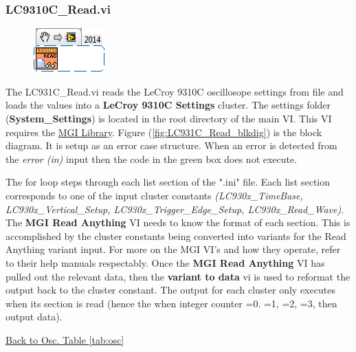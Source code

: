 \documentclass[11pt,a4paper,oldfontcommands]{memoir}
\begin{document}
\subsubsection{LC9310C\_Read.vi}

\noindent\hrulefill

\begin{figure}[H]
	\includegraphics[scale=0.625]{LC931C_Read_main}
	\label{fig:LC9310C_Read_main}
\end{figure}

The LC931C\_Read.vi reads the LeCroy 9310C oscillosope settings from file and loads the values into a \textbf{LeCroy 9310C Settings} cluster. The settings folder (\textbf{System\_Settings}) is located in the root directory of the main VI. This VI requires the \href{http://sine.ni.com/nips/cds/view/p/lang/en/nid/209753}{MGI Library}. Figure (\ref{fig:LC931C_Read_blkdig}) is the block diagram.  It is setup as an error case structure. When an error is detected from the \textit{error (in)} input then the code in the green box does not execute.

The for loop steps through each list section of the ".ini" file. Each list section corresponds to one of the input cluster constants \textit{(LC930x\_TimeBase, LC930x\_Vertical\_Setup, LC930x\_Trigger\_Edge\_Setup, LC930x\_Read\_Wave)}. The \textbf{MGI Read Anything} VI needs to know the format of each section. This is accomplished by the cluster constants being converted into variants for the Read Anything variant input.  For more on the MGI VI's and how they operate, refer to their help manuals respectably. Once the \textbf{MGI Read Anything} VI has pulled out the relevant data, then the \textbf{variant to data} vi is used to reformat the output back to the cluster constant. The output for each cluster only executes when its section is read (hence the when integer counter =0. =1, =2, =3, then output data). 

\noindent\hrulefill \hyperref[tab:osc]{Back to Osc. Table \ref{tab:osc}}
\end{document}
